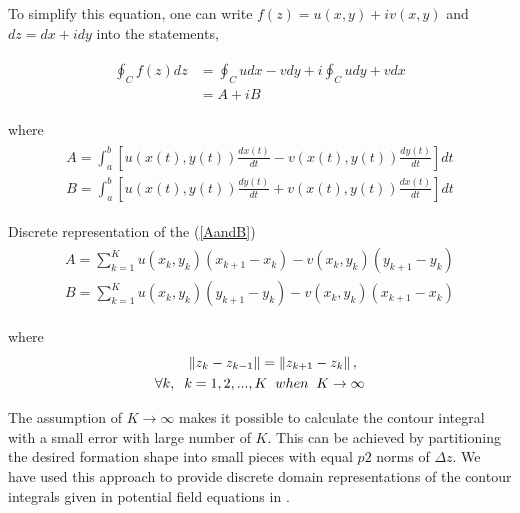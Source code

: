 \documentclass[letterpaper, 10 pt, conference]{ieeeconf}  %
\newcommand{\norm}[1]{\left\lVert#1\right\rVert}
\begin{document}
To simplify this equation, one can write $f(z) = u(x,y) + iv(x,y)$ and $dz = dx + idy$ into the statements,

\begin{align} \label{contour_integral}
\begin{split}
\oint_C f(z)dz & = \oint_C u dx - v dy + i \oint_C u dy + v dx \\
&= A + i B
\end{split}
\end{align}

where
\begin{align} \label{AandB}
\begin{split}
A = \int_{a}^{b}\left[u(x(t),y(t) )\frac{dx(t)}{dt} - v(x(t),y(t) )\frac{dy(t)}{dt}\right]dt \\
B = \int_{a}^{b} \left[u(x(t),y(t) )\frac{dy(t)}{dt} + v(x(t),y(t) )\frac{dx(t)}{dt}\right]dt
\end{split}
\end{align}

Discrete representation of the (\ref{AandB})
\begin{align} \label{AandB_discrete}
\begin{split}
A = \sum_{k=1}^{K} {u(x_k, y_k)(x_{k+1} - x_k) - v(x_k, y_k)(y_{k+1} - y_k) }\\
B = \sum_{k=1}^{K} {u(x_k, y_k)(y_{k+1} - y_k) - v(x_k, y_k)(x_{k+1} - x_k) }
\end{split}
\end{align}

where
\begin{equation}
\begin{split}
\norm{z_k - z_{k-1}} = \norm{z_{k+1} - z_k}, \hspace{0.2cm}\\ 
 \forall k,   \hspace{0.2cm} k=1,2,...,K \hspace{0.2cm} when  \hspace{0.2cm} K \to\infty
\end{split}
\end{equation}

The assumption of $K \to\infty$ makes it possible to calculate the contour integral with a small error with large number of $K$. This can be achieved by partitioning the desired formation shape  into small pieces with equal $p2$ norms of $\Delta z$. We have used this approach to provide discrete domain representations of the contour integrals given in potential field equations in \cite{17}.
\end{document}
